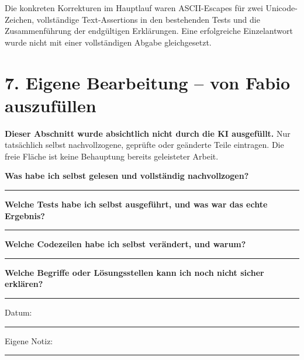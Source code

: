 \documentclass[11pt,a4paper]{article}
\begin{document}
Die konkreten Korrekturen im Hauptlauf waren ASCII-Escapes für zwei Unicode-Zeichen, vollständige Text-Assertions in den bestehenden Tests und die Zusammenführung der endgültigen Erklärungen. Eine erfolgreiche Einzelantwort wurde nicht mit einer vollständigen Abgabe gleichgesetzt.

\newpage
\section*{7. Eigene Bearbeitung -- von Fabio auszufüllen}
\textbf{Dieser Abschnitt wurde absichtlich nicht durch die KI ausgefüllt.} Nur tatsächlich selbst nachvollzogene, geprüfte oder geänderte Teile eintragen. Die freie Fläche ist keine Behauptung bereits geleisteter Arbeit.

\textbf{Was habe ich selbst gelesen und vollständig nachvollzogen?}
\vspace{32mm}
\hrule
\vspace{8mm}
\textbf{Welche Tests habe ich selbst ausgeführt, und was war das echte Ergebnis?}
\vspace{32mm}
\hrule
\vspace{8mm}
\textbf{Welche Codezeilen habe ich selbst verändert, und warum?}
\vspace{32mm}
\hrule
\vspace{8mm}
\textbf{Welche Begriffe oder Lösungsstellen kann ich noch nicht sicher erklären?}
\vspace{24mm}
\hrule
\vspace{10mm}
Datum: \rule{35mm}{0.4pt}\hfill Eigene Notiz: \rule{65mm}{0.4pt}
\end{document}
